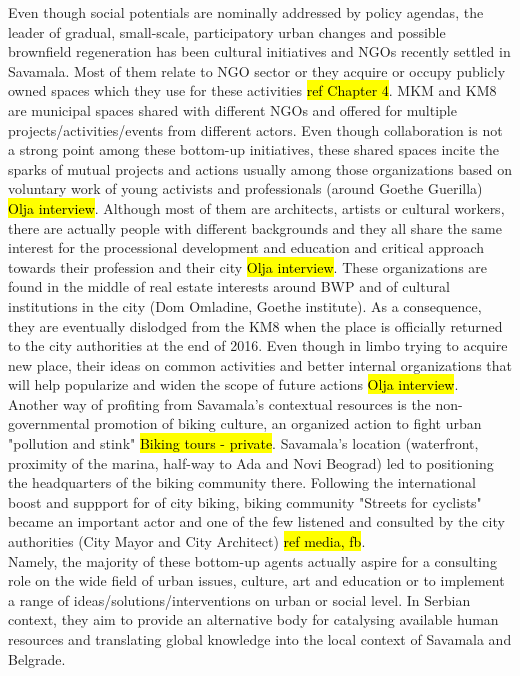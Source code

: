 \documentclass[11pt]{report}
\begin{document}
Even though social potentials are nominally addressed by policy agendas, the leader of gradual, small-scale, participatory urban changes and possible brownfield regeneration has been cultural initiatives and NGOs recently settled in Savamala.
Most of them relate to NGO sector or they acquire or occupy publicly owned spaces which they use for these activities \hl{ref Chapter 4}. MKM and KM8 are municipal spaces shared with different NGOs and offered for multiple projects/activities/events from different actors.
Even though collaboration is not a strong point among these bottom-up initiatives, these shared spaces incite the sparks of mutual projects and actions usually among those organizations based on voluntary work of young activists and professionals (around Goethe Guerilla) \hl{Olja interview}. Although most of them are architects, artists or cultural workers, there are actually people with different backgrounds and they all share the same interest for the processional development and education and critical approach towards their profession and their city \hl{Olja interview}.
These organizations are found in the middle of real estate interests around BWP and  of cultural institutions in the city (Dom Omladine, Goethe institute). As a consequence, they are eventually dislodged from the KM8 when the place is officially returned to the city authorities at the end of 2016. Even though in limbo trying to acquire new place, their ideas on common activities and better internal organizations that will help popularize and widen the scope of future actions \hl{Olja interview}.
\\
Another way of profiting from Savamala's contextual resources is the non-governmental promotion of biking culture, an organized action to fight urban "pollution and stink" \hl{Biking tours - private}.
Savamala's location (waterfront, proximity of the marina, half-way to Ada and Novi Beograd) led to positioning the headquarters of the biking community there. Following the international boost and suppport for of city biking, biking community "Streets for cyclists" became an important actor and one of the few listened and consulted by the city authorities (City Mayor and City Architect) \hl{ref media, fb}.
\\
Namely, the majority of these bottom-up agents actually aspire for a consulting role on the wide field of urban issues, culture, art and education or to implement a range of ideas/solutions/interventions on urban or social level. In Serbian context, they aim to provide an alternative body for catalysing available human resources and translating global knowledge into the local context of Savamala and Belgrade.
\end{document}

